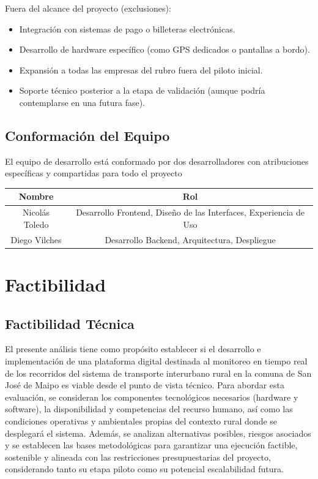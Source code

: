 \documentclass[12pt]{article}
\begin{document}
Fuera del alcance del proyecto (exclusiones):
\begin{itemize}
    \item Integración con sistemas de pago o billeteras electrónicas.

    \item Desarrollo de hardware específico (como GPS dedicados o pantallas a bordo).

    \item Expansión a todas las empresas del rubro fuera del piloto inicial.

    \item Soporte técnico posterior a la etapa de validación (aunque podría contemplarse en una futura fase).
\end{itemize}
\subsection{Conformación del Equipo}
El equipo de desarrollo está conformado por dos desarrolladores con atribuciones específicas y compartidas para todo el proyecto
\begin{table}[!h]
    \centering
    \begin{tabular}{|c|c|}
        \hline
        Nombre & Rol \\
        \hline
         Nicolás Toledo &  Desarrollo Frontend, Diseño de las Interfaces, Experiencia de Uso\\
         \hline
         Diego Vilches & Desarrollo Backend, Arquitectura, Despliegue \\
         \hline
    \end{tabular}
\end{table}
\newpage
\section{Factibilidad}
\subsection{Factibilidad Técnica}
El presente análisis tiene como propósito establecer si el desarrollo e implementación de una plataforma digital destinada al monitoreo en tiempo real de los recorridos del sistema de transporte interurbano rural en la comuna de San José de Maipo es viable desde el punto de vista técnico. Para abordar esta evaluación, se consideran los componentes tecnológicos necesarios (hardware y software), la disponibilidad y competencias del recurso humano, así como las condiciones operativas y ambientales propias del contexto rural donde se desplegará el sistema. Además, se analizan alternativas posibles, riesgos asociados y se establecen las bases metodológicas para garantizar una ejecución factible, sostenible y alineada con las restricciones presupuestarias del proyecto, considerando tanto su etapa piloto como su potencial escalabilidad futura.
\end{document}
